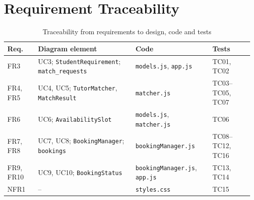 \documentclass[11pt,a4paper]{article}
\begin{document}
\section{Requirement Traceability}
\begin{table}[H]
\centering
\caption{Traceability from requirements to design, code and tests}
\small
\begin{tabularx}{\linewidth}{@{}l l X l@{}}
\toprule
\textbf{Req.} & \textbf{Diagram element} & \textbf{Code} & \textbf{Tests}\\ \midrule
FR3 & UC3; \texttt{StudentRequirement}; \texttt{match\_requests} & \texttt{models.js}, \texttt{app.js} & TC01, TC02\\
FR4, FR5 & UC4, UC5; \texttt{TutorMatcher}, \texttt{MatchResult} & \texttt{matcher.js} & TC03--TC05, TC07\\
FR6 & UC6; \texttt{AvailabilitySlot} & \texttt{models.js}, \texttt{matcher.js} & TC06\\
FR7, FR8 & UC7, UC8; \texttt{BookingManager}; \texttt{bookings} & \texttt{bookingManager.js} & TC08--TC12, TC16\\
FR9, FR10 & UC9, UC10; \texttt{BookingStatus} & \texttt{bookingManager.js}, \texttt{app.js} & TC13, TC14\\
NFR1 & -- & \texttt{styles.css} & TC15\\
\bottomrule
\end{tabularx}
\end{table}
\end{document}
